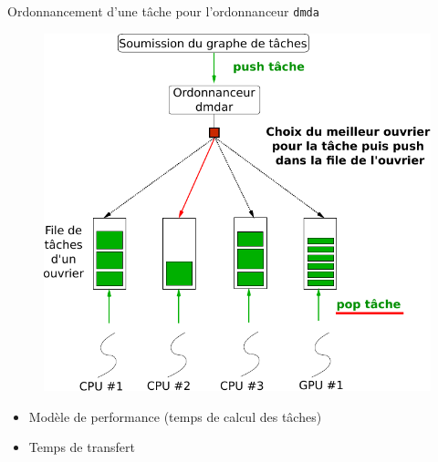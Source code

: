 \documentclass[9pt]{beamer}
\begin{document}
\begin{frame}{\textcolor{inriaGrey}{Ordonnancement d'une tâche pour l'ordonnanceur \texttt{dmda}}}
  \begin{minipage}{0.65\textwidth}
    \begin{figure}
      \centering
      \includegraphics[width=1\linewidth]{img/sched_dmda.pdf}
    \end{figure}
  \end{minipage} \hfill
  \begin{minipage}{0.3\textwidth}
    \begin{itemize}
    \item Modèle de performance (temps de calcul des tâches)
    \item Temps de transfert
    \end{itemize}
  \end{minipage}
\end{frame}
\end{document}
